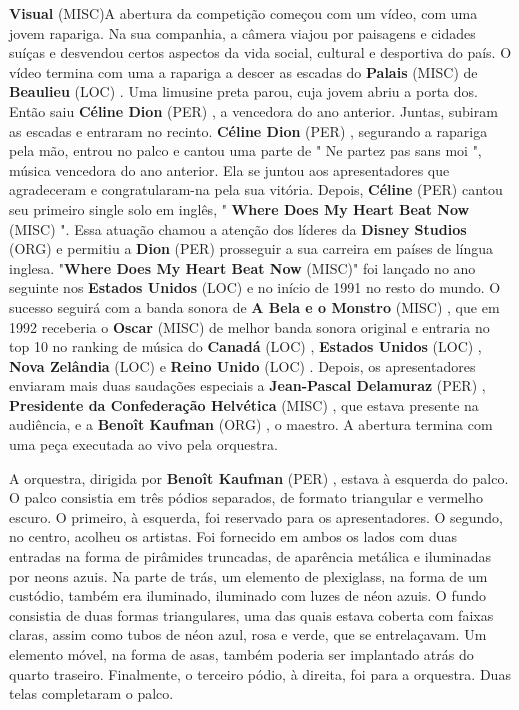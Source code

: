 \documentclass[12pt,a4paper]{article}
\begin{document}
\textbf{Visual} (MISC)A abertura da competição começou com um vídeo, com uma jovem rapariga. Na sua companhia, a câmera viajou por paisagens e cidades suíças e desvendou certos aspectos da vida social, cultural e desportiva do país. O vídeo termina com uma a rapariga a descer as escadas do \textbf{Palais} (MISC) de \textbf{Beaulieu} (LOC) . Uma limusine preta parou, cuja jovem abriu a porta dos. Então saiu \textbf{Céline Dion} (PER) , a vencedora do ano anterior. Juntas, subiram as escadas e entraram no recinto. \textbf{Céline Dion} (PER) , segurando a rapariga pela mão, entrou no palco e cantou uma parte de " Ne partez pas sans moi ", música vencedora do ano anterior. Ela se juntou aos apresentadores que agradeceram e congratularam-na pela sua vitória. Depois, \textbf{Céline} (PER) cantou seu primeiro single solo em inglês, " \textbf{Where Does My Heart Beat Now} (MISC) ". Essa atuação chamou a atenção dos líderes da \textbf{Disney Studios} (ORG) e permitiu a \textbf{Dion} (PER) prosseguir a sua carreira em países de língua inglesa. "\textbf{Where Does My Heart Beat Now} (MISC)" foi lançado no ano seguinte nos \textbf{Estados Unidos} (LOC) e no início de 1991 no resto do mundo. O sucesso seguirá com a banda sonora de \textbf{A Bela e o Monstro} (MISC) , que em 1992 receberia o \textbf{Oscar} (MISC) de melhor banda sonora original e entraria no top 10 no ranking de música do \textbf{Canadá} (LOC) , \textbf{Estados Unidos} (LOC) , \textbf{Nova Zelândia} (LOC) e \textbf{Reino Unido} (LOC) . Depois, os apresentadores enviaram mais duas saudações especiais a \textbf{Jean-Pascal Delamuraz} (PER) , \textbf{Presidente da Confederação Helvética} (MISC) , que estava presente na audiência, e a \textbf{Benoît Kaufman} (ORG) , o maestro. A abertura termina com uma peça executada ao vivo pela orquestra.

A orquestra, dirigida por \textbf{Benoît Kaufman} (PER) , estava à esquerda do palco. O palco consistia em três pódios separados, de formato triangular e vermelho escuro. O primeiro, à esquerda, foi reservado para os apresentadores. O segundo, no centro, acolheu os artistas. Foi fornecido em ambos os lados com duas entradas na forma de pirâmides truncadas, de aparência metálica e iluminadas por neons azuis. Na parte de trás, um elemento de plexiglass, na forma de um custódio, também era iluminado, iluminado com luzes de néon azuis. O fundo consistia de duas formas triangulares, uma das quais estava coberta com faixas claras, assim como tubos de néon azul, rosa e verde, que se entrelaçavam. Um elemento móvel, na forma de asas, também poderia ser implantado atrás do quarto traseiro. Finalmente, o terceiro pódio, à direita, foi para a orquestra. Duas telas completaram o palco.
\end{document}
